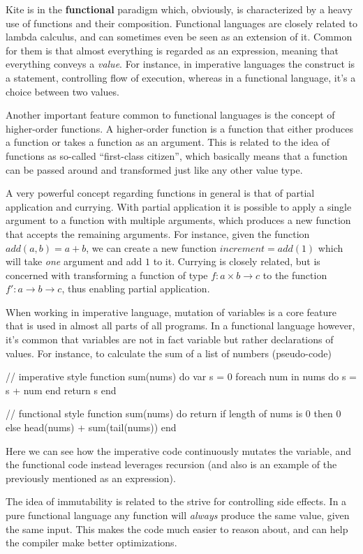 Kite is in the \textbf{functional} paradigm which, obviously, is characterized by a heavy use of functions and their composition. Functional languages are closely related to lambda calculus, and can sometimes even be seen as an extension of it. Common for them is that almost everything is regarded as an expression, meaning that everything conveys a \emph{value}. For instance, in imperative languages the  construct is a statement, controlling flow of execution, whereas in a functional language, it's a choice between two values. 

Another important feature common to functional languages is the concept of higher-order functions. A higher-order function is a function that either produces a function or takes a function as an argument. This is related to the idea of functions as so-called ``first-class citizen'', which basically means that a function can be passed around and transformed just like any other value type.

A very powerful concept regarding functions in general is that of partial application and currying. With partial application it is possible to apply a single argument to a function with multiple arguments, which produces a new function that accepts the remaining arguments. For instance, given the function $add(a, b) = a + b$, we can create a new function $increment = add(1)$ which will take \emph{one} argument and add $1$ to it. Currying is closely related, but is concerned with transforming a function of type $f : a \times b \rightarrow c$ to the function $f' : a \rightarrow b \rightarrow c$, thus enabling partial application.

When working in imperative language, mutation of variables is a core feature that is used in almost all parts of all programs. In a functional language however, it's common that variables are not in fact variable but rather declarations of values. For instance, to calculate the sum of a list of numbers (pseudo-code)

\begin{pseudo}
// imperative style
function sum(nums) do
  var s = 0
  foreach num in nums do
    s = s + num
  end
  return s
end

// functional style
function sum(nums) do
  return if length of nums is 0
    then 0
    else head(nums) + sum(tail(nums))
end
\end{pseudo}

Here we can see how the imperative code continuously mutates the  variable, and the functional code instead leverages recursion (and also is an example of the previously mentioned  as an expression).

The idea of immutability is related to the strive for controlling side effects. In a pure functional language any function will \emph{always} produce the same value, given the same input. This makes the code much easier to reason about, and can help the compiler make better optimizations.

